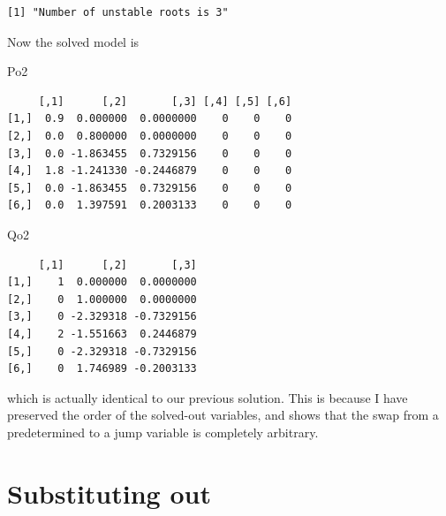 \documentclass[
  letterpaper,
]{book}
\newenvironment{Shaded}{\begin{snugshade}}{\end{snugshade}}
\newcommand{\NormalTok}[1]{\textcolor[rgb]{0.00,0.23,0.31}{#1}}
\newcommand{\OtherTok}[1]{\textcolor[rgb]{0.00,0.23,0.31}{#1}}
\newcommand{\SpecialCharTok}[1]{\textcolor[rgb]{0.37,0.37,0.37}{#1}}
\begin{document}
\begin{verbatim}
[1] "Number of unstable roots is 3"
\end{verbatim}

\begin{Shaded}
\end{Shaded}

Now the solved model is

\begin{Shaded}
\begin{Highlighting}[]
\NormalTok{Po2}
\end{Highlighting}
\end{Shaded}

\begin{verbatim}
     [,1]      [,2]       [,3] [,4] [,5] [,6]
[1,]  0.9  0.000000  0.0000000    0    0    0
[2,]  0.0  0.800000  0.0000000    0    0    0
[3,]  0.0 -1.863455  0.7329156    0    0    0
[4,]  1.8 -1.241330 -0.2446879    0    0    0
[5,]  0.0 -1.863455  0.7329156    0    0    0
[6,]  0.0  1.397591  0.2003133    0    0    0
\end{verbatim}

\begin{Shaded}
\begin{Highlighting}[]
\NormalTok{Qo2}
\end{Highlighting}
\end{Shaded}

\begin{verbatim}
     [,1]      [,2]       [,3]
[1,]    1  0.000000  0.0000000
[2,]    0  1.000000  0.0000000
[3,]    0 -2.329318 -0.7329156
[4,]    2 -1.551663  0.2446879
[5,]    0 -2.329318 -0.7329156
[6,]    0  1.746989 -0.2003133
\end{verbatim}

which is actually identical to our previous solution. This is because I
have preserved the order of the solved-out variables, and shows that the
swap from a predetermined to a jump variable is completely arbitrary.

\hypertarget{substituting-out}{%
\section{Substituting out}\label{substituting-out}}
\end{document}
